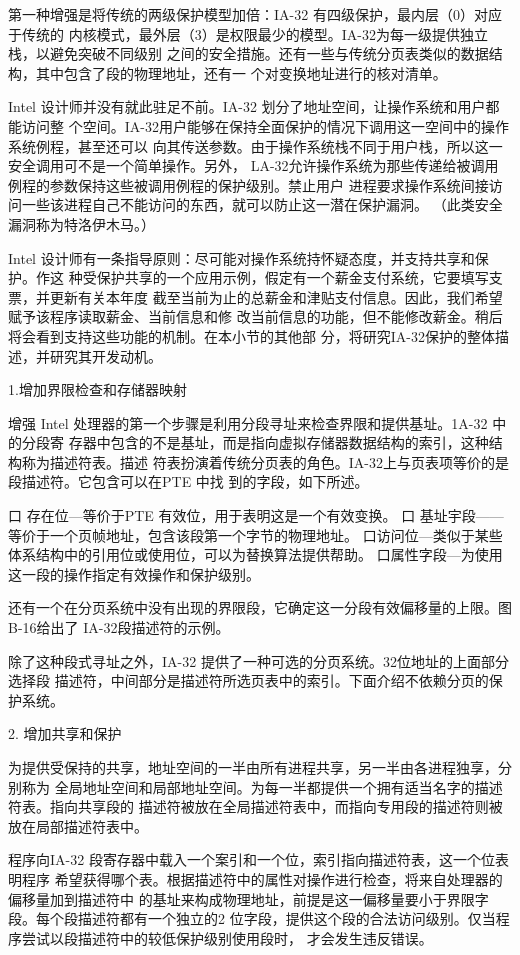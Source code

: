 第一种增强是将传统的两级保护模型加倍：IA-32 有四级保护，最内层（0）对应于传统的
内核模式，最外层（3）是权限最少的模型。IA-32为每一级提供独立栈，以避免突破不同级别
之间的安全措施。还有一些与传统分页表类似的数据结构，其中包含了段的物理地址，还有一
个对变换地址进行的核对清单。

Intel 设计师并没有就此驻足不前。IA-32 划分了地址空间，让操作系统和用户都能访问整
个空间。IA-32用户能够在保持全面保护的情况下调用这一空间中的操作系统例程，甚至还可以
向其传送参数。由于操作系统栈不同于用户栈，所以这一安全调用可不是一个简单操作。另外，
LA-32允许操作系统为那些传递给被调用例程的参数保持这些被调用例程的保护级别。禁止用户
进程要求操作系统间接访问一些该进程自己不能访问的东西，就可以防止这一潜在保护漏洞。
（此类安全漏洞称为特洛伊木马。）

Intel 设计师有一条指导原则：尽可能对操作系统持怀疑态度，并支持共享和保护。作这
种受保护共享的一个应用示例，假定有一个薪金支付系统，它要填写支票，并更新有关本年度
截至当前为止的总薪金和津贴支付信息。因此，我们希望赋予该程序读取薪金、当前信息和修
改当前信息的功能，但不能修改薪金。稍后将会看到支持这些功能的机制。在本小节的其他部
分，将研究IA-32保护的整体描述，并研究其开发动机。

1.增加界限检查和存储器映射

增强 Intel 处理器的第一个步骤是利用分段寻址来检查界限和提供基址。1A-32 中的分段寄
存器中包含的不是基址，而是指向虚拟存储器数据结构的索引，这种结构称为描述符表。描述
符表扮演着传统分页表的角色。IA-32上与页表项等价的是段描述符。它包含可以在PTE 中找
到的字段，如下所述。

口 存在位—等价于PTE 有效位，用于表明这是一个有效变换。
口 基址宇段——等价于一个页帧地址，包含该段第一个字节的物理地址。
口访问位—类似于某些体系结构中的引用位或使用位，可以为替换算法提供帮助。
口属性字段—为使用这一段的操作指定有效操作和保护级别。

还有一个在分页系统中没有出现的界限段，它确定这一分段有效偏移量的上限。图B-16给出了
IA-32段描述符的示例。

除了这种段式寻址之外，IA-32 提供了一种可选的分页系统。32位地址的上面部分选择段
描述符，中间部分是描述符所选页表中的索引。下面介绍不依赖分页的保护系统。

2. 增加共享和保护

为提供受保持的共享，地址空间的一半由所有进程共享，另一半由各进程独享，分别称为
全局地址空间和局部地址空间。为每一半都提供一个拥有适当名字的描述符表。指向共享段的
描述符被放在全局描述符表中，而指向专用段的描述符则被放在局部描述符表中。

程序向IA-32 段寄存器中载入一个案引和一个位，索引指向描述符表，这一个位表明程序
希望获得哪个表。根据描述符中的属性对操作进行检查，将来自处理器的偏移量加到描述符中
的基址来构成物理地址，前提是这一偏移量要小于界限字段。每个段描述符都有一个独立的2
位字段，提供这个段的合法访问级别。仅当程序尝试以段描述符中的较低保护级别使用段时，
才会发生违反错误。

